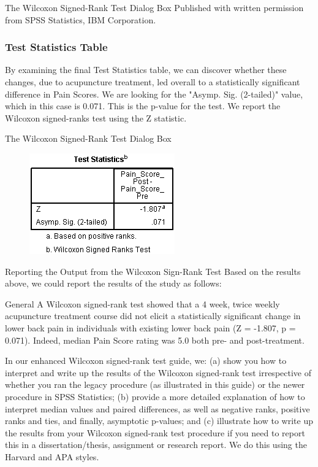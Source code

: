 \documentclass[]{article}
\begin{document}
The Wilcoxon Signed-Rank Test Dialog Box
Published with written permission from SPSS Statistics, IBM Corporation.

\subsubsection*{Test Statistics Table}
By examining the final Test Statistics table, we can discover whether these changes, due to acupuncture treatment, led overall to a statistically significant difference in Pain Scores. We are looking for the "Asymp. Sig. (2-tailed)" value, which in this case is 0.071. This is the p-value for the test. We report the Wilcoxon signed-ranks test using the Z statistic.

The Wilcoxon Signed-Rank Test Dialog Box
\begin{figure}[h!]
\centering
\includegraphics[width=0.7\linewidth]{images/wilcoxon-signed-rank-test-output-3}
\caption{}
\label{fig:wilcoxon-signed-rank-test-output-3}
\end{figure}

Reporting the Output from the Wilcoxon Sign-Rank Test
Based on the results above, we could report the results of the study as follows:

General
A Wilcoxon signed-rank test showed that a 4 week, twice weekly acupuncture treatment course did not elicit a statistically significant change in lower back pain in individuals with existing lower back pain (Z = -1.807, p = 0.071). Indeed, median Pain Score rating was 5.0 both pre- and post-treatment.

In our enhanced Wilcoxon signed-rank test guide, we: (a) show you how to interpret and write up the results of the Wilcoxon signed-rank test irrespective of whether you ran the legacy procedure (as illustrated in this guide) or the newer procedure in SPSS Statistics; (b) provide a more detailed explanation of how to interpret median values and paired differences, as well as negative ranks, positive ranks and ties, and finally, asymptotic p-values; and (c) illustrate how to write up the results from your Wilcoxon signed-rank test procedure if you need to report this in a dissertation/thesis, assignment or research report. We do this using the Harvard and APA styles. 
\end{document}
